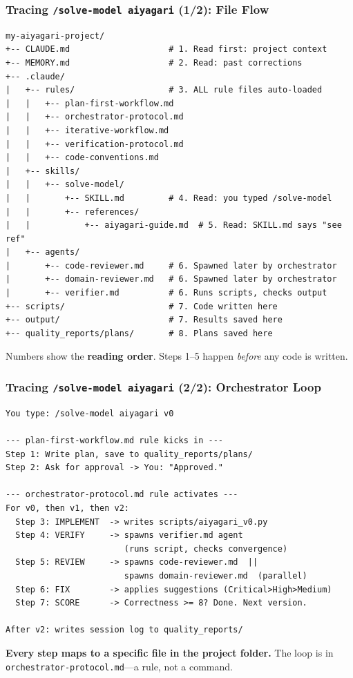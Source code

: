 \documentclass[10pt,english,aspectratio=169]{beamer}
\begin{document}
\begin{frame}[fragile]
\frametitle{Tracing \texttt{/solve-model aiyagari} (1/2): File Flow}

\begin{lstlisting}[style=pythonstyle,language={},basicstyle=\ttfamily\scriptsize]
my-aiyagari-project/
+-- CLAUDE.md                    # 1. Read first: project context
+-- MEMORY.md                    # 2. Read: past corrections
+-- .claude/
|   +-- rules/                   # 3. ALL rule files auto-loaded
|   |   +-- plan-first-workflow.md
|   |   +-- orchestrator-protocol.md
|   |   +-- iterative-workflow.md
|   |   +-- verification-protocol.md
|   |   +-- code-conventions.md
|   +-- skills/
|   |   +-- solve-model/
|   |       +-- SKILL.md         # 4. Read: you typed /solve-model
|   |       +-- references/
|   |           +-- aiyagari-guide.md  # 5. Read: SKILL.md says "see ref"
|   +-- agents/
|       +-- code-reviewer.md     # 6. Spawned later by orchestrator
|       +-- domain-reviewer.md   # 6. Spawned later by orchestrator
|       +-- verifier.md          # 6. Runs scripts, checks output
+-- scripts/                     # 7. Code written here
+-- output/                      # 7. Results saved here
+-- quality_reports/plans/       # 8. Plans saved here
\end{lstlisting}

Numbers show the \textbf{reading order}. Steps 1--5 happen \textit{before} any code is written.
\end{frame}

\begin{frame}[fragile]
\frametitle{Tracing \texttt{/solve-model aiyagari} (2/2): Orchestrator Loop}

\begin{lstlisting}[style=pythonstyle,language={},basicstyle=\ttfamily\scriptsize]
You type: /solve-model aiyagari v0

--- plan-first-workflow.md rule kicks in ---
Step 1: Write plan, save to quality_reports/plans/
Step 2: Ask for approval -> You: "Approved."

--- orchestrator-protocol.md rule activates ---
For v0, then v1, then v2:
  Step 3: IMPLEMENT  -> writes scripts/aiyagari_v0.py
  Step 4: VERIFY     -> spawns verifier.md agent
                        (runs script, checks convergence)
  Step 5: REVIEW     -> spawns code-reviewer.md  ||
                        spawns domain-reviewer.md  (parallel)
  Step 6: FIX        -> applies suggestions (Critical>High>Medium)
  Step 7: SCORE      -> Correctness >= 8? Done. Next version.

After v2: writes session log to quality_reports/
\end{lstlisting}

\textbf{Every step maps to a specific file in the project folder.} The loop is in \texttt{orchestrator-protocol.md}---a rule, not a command.
\end{frame}
\end{document}
